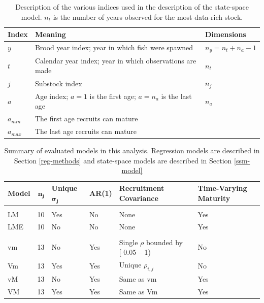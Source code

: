 \documentclass[12pt,]{book}
\theoremstyle{definition}
\theoremstyle{definition}
\theoremstyle{definition}
\theoremstyle{remark}
\begin{document}
\begin{table}

\caption{\label{tab:ch4-notation-table}Description of the various indices used in the description of the state-space model. $n_t$ is the number of years observed for the most data-rich stock.}
\centering
\begin{tabular}[t]{l>{\raggedright\arraybackslash}p{25em}>{\raggedright\arraybackslash}p{10em}}
\toprule
\textbf{Index} & \textbf{Meaning} & \textbf{Dimensions}\\
\midrule
$y$ & Brood year index; year in which fish were spawned & $n_y=n_t + n_a - 1$\\
$t$ & Calendar year index; year in which observations are made & $n_t$\\
$j$ & Substock index & $n_j$\\
$a$ & Age index; $a=1$ is the first age; $a=n_a$ is the last age & $n_a$\\
$a_{min}$ & The first age recruits can mature & 1\\
$a_{max}$ & The last age recruits can mature & 1\\
\bottomrule
\end{tabular}
\end{table}

\clearpage

\begin{table}

\caption{\label{tab:models-table}Summary of evaluated models in this analysis. Regression models are described in Section \ref{reg-methods} and state-space models are described in Section \ref{ssm-model}}
\centering
\begin{tabular}[t]{lrll>{\raggedright\arraybackslash}p{15em}>{\raggedright\arraybackslash}p{7em}}
\toprule
\textbf{Model} & $\boldsymbol{n_j}$ & \textbf{Unique} $\boldsymbol{\sigma_j}$ & \textbf{AR(1)} & \textbf{Recruitment Covariance} & \textbf{Time-Varying Maturity}\\
\midrule
\addlinespace[0.3em]
\multicolumn{6}{l}{\textbf{Regression-Based Models}}\\
\hline
\hspace{1em}LM & 10 & Yes & No & None & Yes\\
\hspace{1em}LME & 10 & No & No & None & Yes\\
\addlinespace[0.3em]
\multicolumn{6}{l}{\textbf{State-Space Models}}\\
\hline
\hspace{1em}vm & 13 & No & Yes & Single $\rho$ bounded by [-0.05 -- 1) & No\\
\hspace{1em}Vm & 13 & Yes & Yes & Unique $\rho_{i,j}$ & No\\
\hspace{1em}vM & 13 & No & Yes & Same as vm & Yes\\
\hspace{1em}VM & 13 & Yes & Yes & Same as Vm & Yes\\
\bottomrule
\end{tabular}
\end{table}
\end{document}
